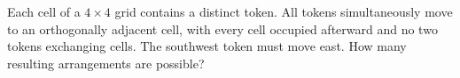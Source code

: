 Each cell of a $4\times4$ grid contains a distinct token. All tokens simultaneously move to an orthogonally adjacent cell, with every cell occupied afterward and no two tokens exchanging cells. The southwest token must move east. How many resulting arrangements are possible?
